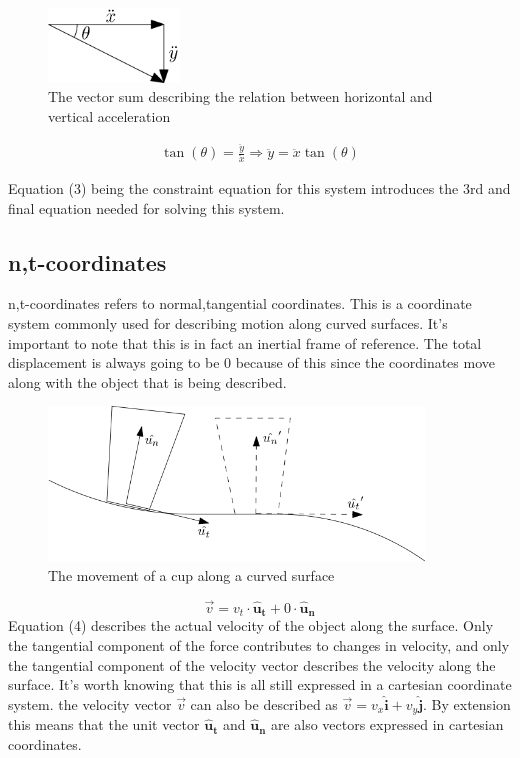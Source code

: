 \documentclass[11pt, a4paper]{article}
\begin{document}
\begin{figure}[h]
    \centerline{\includegraphics[width=3.5cm]{images/Vector_Sum.png}}
    \caption{The vector sum describing the relation between horizontal and vertical acceleration}
\end{figure}

\begin{gather}
    \tan(\theta) = \frac{\ddot{y}}{\ddot{x}} \Rightarrow \ddot{y} = \ddot{x} \tan(\theta)  
\end{gather}

Equation (3) being the constraint equation for this system introduces the 3rd and final equation needed for
solving this system.

\subsection{n,t-coordinates}
n,t-coordinates refers to normal,tangential coordinates. This is a coordinate system commonly used for describing
motion along curved surfaces. It's important to note that this is in fact an inertial frame of reference. The
total displacement is always going to be 0 because of this since the coordinates move along with the object that
is being described.
\begin{figure}[h]
    \centerline{\includegraphics[width=10cm]{images/NT_example.png}}
    \caption{The movement of a cup along a curved surface}
\end{figure}

\begin{equation}
    \vec{v} = v_t \cdot \boldsymbol{\hat{u}_t} + 0 \cdot \boldsymbol{\hat{u}_n}
\end{equation}
Equation (4) describes the actual velocity of the object along the surface. Only the tangential component of the
force contributes to changes in velocity, and only the tangential component of the velocity vector describes
the velocity along the surface. It's worth knowing that this is all still expressed in a cartesian coordinate system.
the velocity vector $\vec{v}$ can also be described as $\vec{v} = v_x\boldsymbol{\hat{i}} + v_y\boldsymbol{\hat{j}}$.
By extension this means that the unit vector $\boldsymbol{\hat{u}_t}$ and $\boldsymbol{\hat{u}_n}$ are also vectors expressed in cartesian coordinates.
\end{document}
